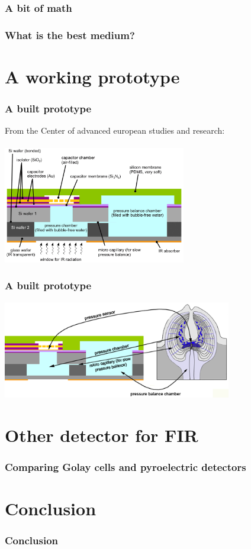 \documentclass[14pt]{beamer}
\begin{document}
\begin{frame}
\frametitle{A bit of math}
\end{frame}

\begin{frame}
\frametitle{What is the best medium?}

\end{frame}

\section{A working prototype}
\begin{frame}
\frametitle{A built prototype}
From the Center of advanced european studies and research:\\
~\\
\includegraphics[width=8cm]{IR_sensor_abb_4_02.png}
\end{frame}
\begin{frame}
\frametitle{A built prototype}
\includegraphics[width=10cm]{IR_sensor_abb_5_02.png}
\end{frame}

\section{Other detector for FIR}
\begin{frame}
\frametitle{Comparing Golay cells and pyroelectric detectors}

\end{frame}

\section{Conclusion}
\begin{frame}
\frametitle{Conclusion}

\end{frame}


\end{document}
